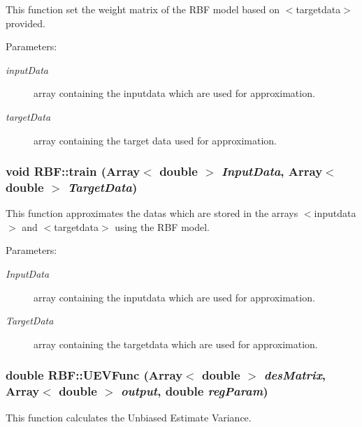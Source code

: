 This function set the weight matrix of the RBF model based on $<$targetdata$>$ provided. 

\begin{Desc}
\item[Parameters:]
\begin{description}
\item[{\em input\-Data}]array containing the inputdata which are used for approximation. \item[{\em target\-Data}]array containing the target data used for approximation.\end{description}
\end{Desc}
\subsubsection{\setlength{\rightskip}{0pt plus 5cm}void RBF::train (Array$<$ double $>$ {\em Input\-Data}, Array$<$ double $>$ {\em Target\-Data})}\label{classRBF_a12}


This function approximates the datas which are stored in the arrays $<$inputdata$>$ and $<$targetdata$>$ using the RBF model. 

\begin{Desc}
\item[Parameters:]
\begin{description}
\item[{\em Input\-Data}]array containing the inputdata which are used for approximation. \item[{\em Target\-Data}]array containing the targetdata which are used for approximation.\end{description}
\end{Desc}
\subsubsection{\setlength{\rightskip}{0pt plus 5cm}double RBF::UEVFunc (Array$<$ double $>$ {\em des\-Matrix}, Array$<$ double $>$ {\em output}, double {\em reg\-Param})\hspace{0.3cm}{\tt  [static]}}\label{classRBF_e9}


This function calculates the Unbiased Estimate Variance. 

